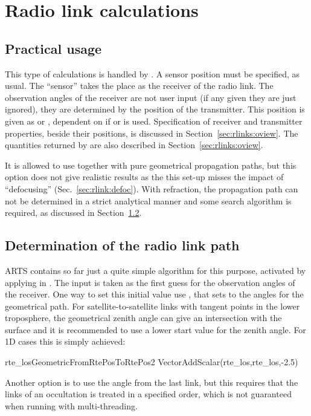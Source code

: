 \section{Radio link calculations}
\label{sec:rlinks}

\subsection{Practical usage}
%
This type of calculations is handled by . A sensor
position must be specified, as usual. The ``sensor'' takes the place as the
receiver of the radio link. The observation angles of the receiver are not user
input (if any given they are just ignored), they are determined by the position
of the transmitter. This position is given as  or
, dependent on if  or 
is used. Specification of receiver and transmitter properties, beside their
positions, is discussed in Section~\ref{sec:rlinks:oview}. The quantities
returned by  are also described in
Section~\ref{sec:rlinks:oview}.

It is allowed to use  together with pure geometrical
propagation paths, but this option does not give realistic results as the this
set-up misses the impact of ``defocusing'' (Sec.~\ref{sec:rlink:defoc}). With
refraction, the propagation path can not be determined in a strict analytical
manner and some search algorithm is required, as discussed in
Section~\ref{sec:rlinks:ppath}.



\subsection{Determination of the radio link path}
\label{sec:rlinks:ppath}

ARTS contains so far just a quite simple algorithm for this purpose, activated
by applying  in . The input
 is taken as the first guess for the observation angles of
the receiver. One way to set this initial value use
, that sets 
to the angles for the geometrical path. For satellite-to-satellite links with
tangent points in the lower troposphere, the geometrical zenith angle can give
an intersection with the surface and it is recommended to use a lower start
value for the zenith angle. For 1D cases this is simply achieved:
\begin{code}
  rte_losGeometricFromRtePosToRtePos2
  VectorAddScalar(rte_los,rte_los,-2.5)
\end{code}
Another option is to use the angle from the last link, but this requires that
the links of an occultation is treated in a specified order, which is not
guaranteed when running with multi-threading.

